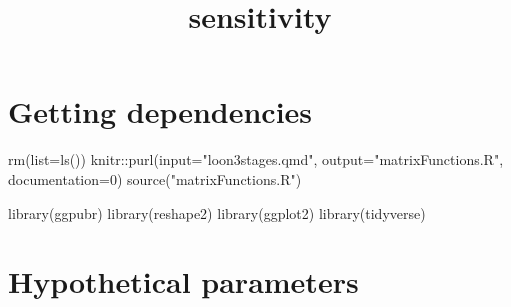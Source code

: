 \documentclass[
  letterpaper,
  DIV=11,
  numbers=noendperiod]{scrartcl}
\title{sensitivity}
\author{}
\date{}
\newenvironment{Shaded}{\begin{snugshade}}{\end{snugshade}}
\newcommand{\AttributeTok}[1]{\textcolor[rgb]{0.40,0.45,0.13}{#1}}
\newcommand{\DecValTok}[1]{\textcolor[rgb]{0.68,0.00,0.00}{#1}}
\newcommand{\FunctionTok}[1]{\textcolor[rgb]{0.28,0.35,0.67}{#1}}
\newcommand{\NormalTok}[1]{\textcolor[rgb]{0.00,0.23,0.31}{#1}}
\newcommand{\SpecialCharTok}[1]{\textcolor[rgb]{0.37,0.37,0.37}{#1}}
\newcommand{\StringTok}[1]{\textcolor[rgb]{0.13,0.47,0.30}{#1}}
\begin{document}
\maketitle



\section{Getting dependencies}\label{getting-dependencies}

\begin{Shaded}
\begin{Highlighting}[]
\FunctionTok{rm}\NormalTok{(}\AttributeTok{list=}\FunctionTok{ls}\NormalTok{())}
\NormalTok{knitr}\SpecialCharTok{::}\FunctionTok{purl}\NormalTok{(}\AttributeTok{input=}\StringTok{"loon3stages.qmd"}\NormalTok{, }\AttributeTok{output=}\StringTok{"matrixFunctions.R"}\NormalTok{, }\AttributeTok{documentation=}\DecValTok{0}\NormalTok{)}
\FunctionTok{source}\NormalTok{(}\StringTok{"matrixFunctions.R"}\NormalTok{)}

\FunctionTok{library}\NormalTok{(ggpubr)}
\FunctionTok{library}\NormalTok{(reshape2)}
\FunctionTok{library}\NormalTok{(ggplot2)}
\FunctionTok{library}\NormalTok{(tidyverse)}
\end{Highlighting}
\end{Shaded}

\section{Hypothetical parameters}\label{hypothetical-parameters}
\end{document}
